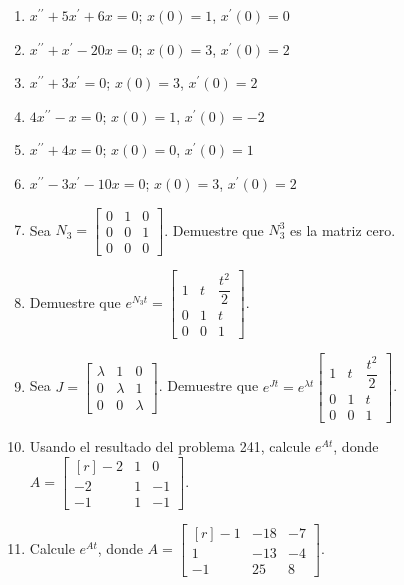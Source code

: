 \begin{enumerate}[resume]
    \item $x^{\prime \prime}+5 x^{\prime}+6 x=0$; $x(0)=1$, $x^{\prime}(0)=0$
    \item $x^{\prime \prime}+x^{\prime}-20 x=0$; $x(0)=3$, $x^{\prime}(0)=2$
    \item $x^{\prime \prime}+3 x^{\prime}=0$; $ x(0)=3$, $x^{\prime}(0)=2$
    \item $4 x^{\prime \prime}-x=0$; $x(0)=1$, $x^{\prime}(0)=-2$
    \item $x^{\prime \prime}+4 x=0$; $x(0)=0$, $x^{\prime}(0)=1$
    \item $x^{\prime \prime}-3 x^{\prime}-10 x=0$; $x(0)=3$, $x^{\prime}(0)=2$
    \item Sea $N_{3} = \begin{bmatrix}0 & 1 & 0 \\ 0 & 0 & 1 \\ 0 & 0 & 0\end{bmatrix}$. Demuestre que $N_{3}^{3}$ es la matriz cero.
    \item Demuestre que $e^{N_{3} t} = \begin{bmatrix}1 & t & \dfrac{t^{2}}{2} \\[2mm] 0 & 1 & t \\ 0 & 0 & 1\end{bmatrix}$.
    \item Sea $J=\begin{bmatrix}\lambda & 1 & 0 \\ 0 & \lambda & 1 \\ 0 & 0 & \lambda\end{bmatrix}$. Demuestre que $e^{J t}=e^{\lambda t} \begin{bmatrix}1 & t & \dfrac{t^{2}}{2} \\[2mm] 0 & 1 & t \\ 0 & 0 & 1\end{bmatrix}$.  \newpage
    \item Usando el resultado del problema 241, calcule $e^{A t}$, donde $A = \begin{bmatrix*}[r]-2 & 1 & 0 \\ -2 & 1 & -1 \\ -1 & 1 & -1\end{bmatrix*}$.
    \item Calcule $e^{A t}$, donde $A = \begin{bmatrix*}[r]-1 & -18 & -7 \\ 1 & -13 & -4 \\ -1 & 25 & 8\end{bmatrix*}$.

\end{enumerate}

